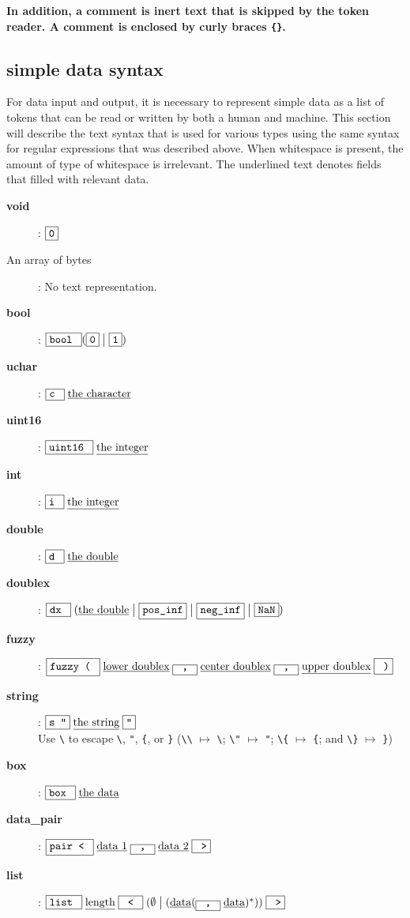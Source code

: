 \documentclass{article}
\newcommand{\literal}[1]{\fbox{\texttt{#1}}}
\newcommand{\sor}{\;\big|\;}
\begin{document}
\textbf{In addition, a comment is inert text that is skipped by the token reader. A comment is enclosed by curly braces \texttt{\{\}}.} 


\subsection{simple data syntax}

For data input and output, it is necessary to represent simple data as a list of tokens that can be read or written by both a human and machine. This section will describe the text syntax that is used for various types using the same syntax for regular expressions that was described above. When whitespace is present, the amount of type of whitespace is irrelevant. The underlined text denotes fields that filled with relevant data. 
\begin{description}
\item[\textbf{void}]: \(\literal{0}\)
\item[An array of bytes]: No text representation. 
\item[\textbf{bool}]: \(\literal{bool }(\literal{0}\sor\literal{1})\)
\item[\textbf{uchar}]: \(\literal{c }\;\underline{\text{the character}}\)
\item[\textbf{uint16}]: \(\literal{uint16 }\;\underline{\text{the integer}}\)
\item[\textbf{int}]: \(\literal{i }\;\underline{\text{the integer}}\)
\item[\textbf{double}]: \(\literal{d }\;\underline{\text{the double}}\)
\item[\textbf{doublex}]: \(\literal{dx }\;(\underline{\text{the double}}\sor\literal{pos\_inf}\sor\literal{neg\_inf} \sor \literal{NaN})\)
\item[\textbf{fuzzy}]: \(\literal{fuzzy ( }\;\underline{\text{lower doublex}}\;\literal{ , }\;\underline{\text{center doublex}}\;\literal{ , }\;\underline{\text{upper doublex}}\;\literal{ )}\)
\item[\textbf{string}]: \(\literal{s "}\;\underline{\text{the string}}\;\literal{"}\) \\ 
Use \texttt{\textbackslash} to escape \texttt{\textbackslash}, \texttt{"}, \texttt{\{}, or \texttt{\}} (\texttt{\textbackslash\textbackslash} \(\mapsto\) \texttt{\textbackslash}; \texttt{\textbackslash"} \(\mapsto\) \texttt{"}; \texttt{\textbackslash\{} \(\mapsto\) \texttt{\{}; and \texttt{\textbackslash\}} \(\mapsto\) \texttt{\}})
\item[\textbf{box}]: \(\literal{box }\;\underline{\text{the data}}\)
\item[\textbf{data\_pair}]: \(\literal{pair < }\;\underline{\text{data 1}}\;\literal{ , }\;\underline{\text{data 2}}\;\literal{ >}\) 
\item[\textbf{list}]: \(\literal{list }\;\underline{\text{length}}\;\literal{ < }\;(\emptyset \sor (\underline{\text{data}}(\literal{ , }\;\underline{\text{data}})^*))\;\literal{ >}\) 
\end{description}
\end{document}
